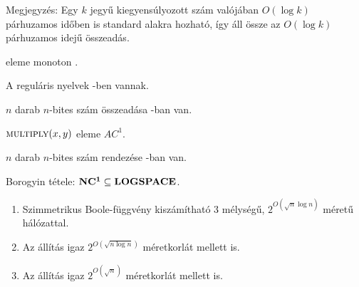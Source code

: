 {	Megjegyzés: Egy $k$ jegyű kiegyensúlyozott szám valójában $O(\log k)$
	párhuzamos időben is standard alakra hozható, így áll össze az
	$O(\log k)$ párhuzamos idejű összeadás.
}


\begin{Exercise}[counter={sorszam}, difficulty=0]
	 eleme monoton .
\end{Exercise}


\begin{Exercise}[counter={sorszam}, difficulty=1]
	A reguláris nyelvek -ben vannak.
\end{Exercise}


\begin{Exercise}[counter={sorszam}, difficulty=0]
	$n$ darab $n$-bites szám összeadása -ban van.
\end{Exercise}


\begin{Exercise}[counter={sorszam}, difficulty=0]
	$\la{MULTIPLY}(x,y)$ eleme $AC^1$. 
\end{Exercise}


\begin{Exercise}[counter={sorszam}, difficulty=0]
	$n$ darab $n$-bites szám rendezése -ban van.
	
\end{Exercise}


\begin{Exercise}[counter={sorszam}, difficulty=0]
	Borogyin tétele: $\mbox{\ensuremath{\mathbf{NC^1}}} \subseteq \mbox{\ensuremath{\mathbf{LOGSPACE}}}$.
	
\end{Exercise}


\begin{Exercise}[counter={sorszam}, difficulty=0]
	\begin{enumerate}
		\item Szimmetrikus Boole-függvény kiszámítható 3 mélységű, $2^{O(\sqrt{n} \log n)}$
		méretű hálózattal.
		\item \hard  Az állítás igaz $2^{O(\sqrt{n \log n})}$ méretkorlát mellett is.
		\item \veryhard Az állítás igaz $2^{O(\sqrt{n})}$ méretkorlát mellett is. 
	\end{enumerate}
\end{Exercise}


